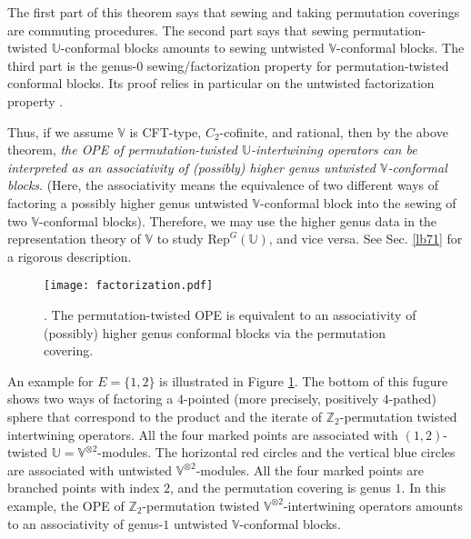 \documentclass[11pt,b5paper,notitlepage]{article}
\theoremstyle{definition}
\theoremstyle{plain}
\newcommand{\Rep}{\mathrm{Rep}}
\newcommand{\Vbb}{\mathbb V}
\newcommand{\Ubb}{\mathbb U}
\newcommand{\Zbb}{\mathbb Z}
\numberwithin{equation}{subsection}
\begin{document}
The first part of this theorem says that sewing and taking permutation coverings are commuting procedures. The second part says that sewing  permutation-twisted $\Ubb$-conformal blocks amounts to sewing untwisted $\Vbb$-conformal blocks. The third part is the genus-$0$ sewing/factorization property for permutation-twisted conformal blocks. Its proof relies in particular on the untwisted factorization property \cite{DGT22}.




Thus, if we assume $\Vbb$ is CFT-type, $C_2$-cofinite, and rational, then by the above theorem, \textit{the OPE of permutation-twisted $\Ubb$-intertwining operators can be interpreted as an associativity of (possibly) higher genus untwisted $\Vbb$-conformal blocks}. (Here, the associativity means the equivalence of two different ways of factoring a possibly higher genus  untwisted $\Vbb$-conformal block into the sewing of two $\Vbb$-conformal blocks).  Therefore, we may use the higher genus data in the representation theory of $\Vbb$ to study $\Rep^G(\Ubb)$, and vice versa. See Sec. \ref{lb71} for a rigorous description.

\begin{figure}[h]
	\centering
	\texttt{[image: factorization.pdf]}
	\caption{. The permutation-twisted OPE is equivalent to an associativity of  (possibly) higher genus conformal blocks via the permutation covering.}
	\label{fig2}
\end{figure}


An example for $E=\{1,2\}$ is illustrated in Figure \ref{fig2}. The bottom of this fugure shows two ways of factoring a $4$-pointed (more precisely, positively $4$-pathed) sphere that correspond to the product and the iterate of $\Zbb_2$-permutation twisted intertwining operators. All the four marked points are associated with $(1,2)$-twisted $\Ubb=\Vbb^{\otimes 2}$-modules. The horizontal red circles and the vertical blue circles are associated with  untwisted $\Vbb^{\otimes 2}$-modules. All the four marked points are branched points with index $2$, and the permutation covering is genus $1$. In this example, the OPE of $\Zbb_2$-permutation twisted $\Vbb^{\otimes 2}$-intertwining operators amounts to an associativity of genus-$1$ untwisted $\Vbb$-conformal blocks. 
\end{document}
